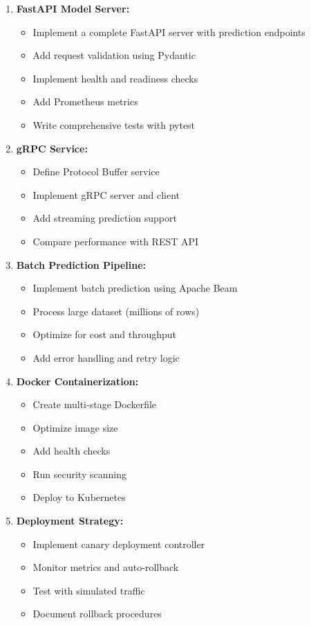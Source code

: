 \begin{enumerate}
    \item \textbf{FastAPI Model Server:}
    \begin{itemize}
        \item Implement a complete FastAPI server with prediction endpoints
        \item Add request validation using Pydantic
        \item Implement health and readiness checks
        \item Add Prometheus metrics
        \item Write comprehensive tests with pytest
    \end{itemize}

    \item \textbf{gRPC Service:}
    \begin{itemize}
        \item Define Protocol Buffer service
        \item Implement gRPC server and client
        \item Add streaming prediction support
        \item Compare performance with REST API
    \end{itemize}

    \item \textbf{Batch Prediction Pipeline:}
    \begin{itemize}
        \item Implement batch prediction using Apache Beam
        \item Process large dataset (millions of rows)
        \item Optimize for cost and throughput
        \item Add error handling and retry logic
    \end{itemize}

    \item \textbf{Docker Containerization:}
    \begin{itemize}
        \item Create multi-stage Dockerfile
        \item Optimize image size
        \item Add health checks
        \item Run security scanning
        \item Deploy to Kubernetes
    \end{itemize}

    \item \textbf{Deployment Strategy:}
    \begin{itemize}
        \item Implement canary deployment controller
        \item Monitor metrics and auto-rollback
        \item Test with simulated traffic
        \item Document rollback procedures
    \end{itemize}


\end{enumerate}
